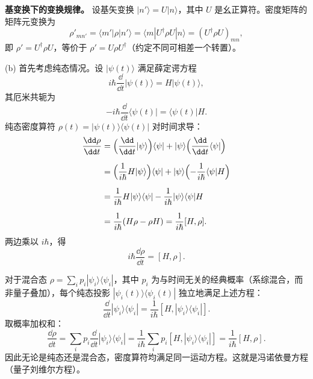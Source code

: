 \begin{solution}
\textbf{基变换下的变换规律。}
设基矢变换 $|n'\rangle = U|n\rangle$，其中 $U$ 是幺正算符。密度矩阵的矩阵元变换为
\[
\rho'_{mn'} = \langle m'|\rho|n'\rangle = \langle m|U^\dagger\rho U|n\rangle = (U^\dagger\rho U)_{mn},
\]
即 $\rho' = U^\dagger\rho U$，等价于 $\rho' = U\rho U^\dagger$（约定不同可相差一个转置）。

(b) 首先考虑纯态情况。设 $|\psi(t)\rangle$ 满足薛定谔方程
\[
i\hbar\frac{\dd}{\dd t}|\psi(t)\rangle = H|\psi(t)\rangle,
\]
其厄米共轭为
\[
-i\hbar\frac{\dd}{\dd t}\langle\psi(t)| = \langle\psi(t)|H.
\]
纯态密度算符 $\rho(t)=|\psi(t)\rangle\langle\psi(t)|$ 对时间求导：
\[
\begin{aligned}
\frac{\dd\rho}{\dd t}
&= \Bigl(\frac{\dd}{\dd t}|\psi\rangle\Bigr)\langle\psi| + |\psi\rangle\Bigl(\frac{\dd}{\dd t}\langle\psi|\Bigr)\\[2mm]
&= \Bigl(\frac{1}{i\hbar}H|\psi\rangle\Bigr)\langle\psi| + |\psi\rangle\Bigl(-\frac{1}{i\hbar}\langle\psi|H\Bigr)\\[2mm]
&= \frac{1}{i\hbar} H|\psi\rangle\langle\psi| - \frac{1}{i\hbar} |\psi\rangle\langle\psi|H \\[2mm]
&= \frac{1}{i\hbar}(H\rho - \rho H) = \frac{1}{i\hbar}[H,\rho].
\end{aligned}
\]
两边乘以 $i\hbar$，得
\[
\boxed{i\hbar\frac{\dd\rho}{\dd t} = [H,\rho].}
\]

对于混合态 $\rho = \sum_i p_i |\psi_i\rangle\langle\psi_i|$，其中 $p_i$ 为与时间无关的经典概率（系综混合，而非量子叠加），每个纯态投影 $|\psi_i(t)\rangle\langle\psi_i(t)|$ 独立地满足上述方程：
\[
\frac{\dd}{\dd t}|\psi_i\rangle\langle\psi_i| = \frac{1}{i\hbar}[H,|\psi_i\rangle\langle\psi_i|].
\]
取概率加权和：
\[
\frac{\dd\rho}{\dd t} = \sum_i p_i\frac{\dd}{\dd t}|\psi_i\rangle\langle\psi_i|
= \frac{1}{i\hbar}\sum_i p_i [H,|\psi_i\rangle\langle\psi_i|]
= \frac{1}{i\hbar}[H,\rho].
\]
因此无论是纯态还是混合态，密度算符均满足同一运动方程。这就是冯诺依曼方程（量子刘维尔方程）。
\end{solution}

